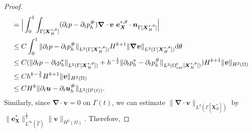 \documentclass[11pt,reqno]{amsart}
\theoremstyle{definition}
\theoremstyle{plain}
\numberwithin{theorem}{section}
\numberwithin{proposition}{section}
\numberwithin{lemma}{section}
\numberwithin{equation}{section}
\newcommand{\bs}[1]{\boldsymbol{#1}}
\newcommand{\uu}[1]  {{\bs{#1}} }
\newcommand{\grad}   { \uu{\nabla}    }
\def\d{\mathrm{d}}
\renewcommand{\(}{\bigl(}
\renewcommand{\)}{\bigr)}
\begin{document}
\begin{proof}
\begin{align*}
&= \Big|\int_0^1 \int_{\Gamma[\bs X_H^{*,\theta}]} ( \partial_tp - \partial_tp_h^\# ) \grad\cdot{\bs v} \,\, {\bs e}_{\bs X}^{*,\theta}\cdot{\bs n}_{\Gamma[\bs X_H^{*,\theta}]} \Big|\\
&\le C\int_0^1 \|\partial_tp - \partial_tp_h^\# \|_{L^2(\Gamma[\bs X_H^{*,\theta}])} H^{k+1} \|\grad{\bs v}\|_{L^2(\Gamma[\bs X_H^{*,\theta}])} \d\theta \\
&\le C(\|\partial_tp - \partial_tp_h^* \|_{L^2(\Gamma[\bs X_H^{*,\theta}])} +h^{-\frac12} \|\partial_tp_h^* - \partial_tp_h^\# \|_{L^2(\Omega^{\rm f}_{\rm ext}[\bs X_H^{*,\theta}])} ) H^{k+1} \|{\bs v}\|_{H^2(\Omega)} \\
&\le Ch^{k-\frac32} H^{k+1} \|{\bs v}\|_{H^2(\Omega)} \\
&\le CH^k \|\partial_t{\bs u}-\partial_t{\bs u}_h^\#\|_{L^2(\Omega^{\rm f}(t))} .
\end{align*}
Similarly, since $\grad\cdot{\bs v}=0$ on $\Gamma(t)$, we can estimate $\|\grad\cdot{\bs v}\|_{L^2(\Gamma[\bs X_H^*])}$ by $\|{\bs e}_{\bs X}^*\|_{L^\infty(\widehat\Gamma)}^{\frac12}\|{\bs v}\|_{H^2(\Omega)}$. Therefore, 

\end{proof}
\end{document}
